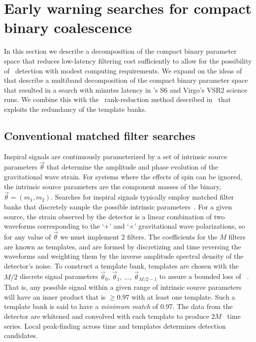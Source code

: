 \section{Early warning searches for compact binary coalescence}
\label{SECII}\label{sec:method}

In this section we describe a decomposition of the compact binary parameter
space that reduces low-latency filtering cost sufficiently to allow for the
possibility of \earlywarning\ detection with modest computing requirements.  We
expand on the ideas of~\cite{Marion2004, Buskulic2010} that describe a
multiband decomposition of the compact binary parameter space that resulted in
a search with minutes latency in \LIGO{}'s S6 and Virgo's VSR2 science runs.
We combine this with the \SVD\ rank-reduction method described
in~\cite{Cannon:2010p10398} that exploits the redundancy of the template banks.

\subsection{Conventional \CBC{} matched filter searches}

Inspiral signals are continuously parameterized by a set of intrinsic source
parameters $\vec\theta$ that determine the amplitude and phase evolution of the
gravitational wave strain. For systems where the effects of spin can be
ignored, the intrinsic source parameters are the component masses of the
binary, $\vec\theta = (m_1, m_2)$. Searches for inspiral signals typically
employ matched filter banks that discretely sample the possible intrinsic
parameters~\cite{findchirppaper}.  For a given source, the strain observed by
the detector is a linear combination of two waveforms corresponding to the
`$+$' and `$\times$' gravitational wave polarizations, so for any value of
$\vec\theta$ we must implement 2 filters.  The coefficients for the $M$ filters
are known as templates, and are formed by discretizing and time reversing the
waveforms and weighting them by the inverse amplitude spectral density of the
detector's noise. To construct a template bank, templates are chosen with the
$M/2$ discrete signal parameters $\vec\theta_0,\, \vec\theta_1,\, \dots,\,
\vec\theta_{M/2-1}$ to assure a bounded loss of \SNR~\cite{Owen:1998dk}. That
is, any possible signal within a given range of intrinsic
source parameters will have an inner product that is $\geqslant 0.97$ with at
least one template. Such a template bank is said to have a {\em minimum match}
of 0.97. The data from the detector are whitened and convolved with each
template to produce $2M$ \SNR\ time series. Local peak-finding across time and
templates determines detection candidates.

